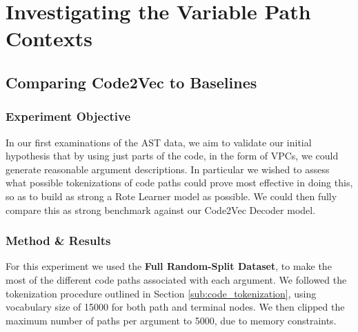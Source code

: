 \section{Investigating the Variable Path Contexts} %
\label{sec:investigating_the_computer_channel}

\subsection{Comparing Code2Vec to Baselines} %
\label{sub:comparing_code2vec_to_baselines}


\subsubsection{Experiment Objective} %

In our first examinations of the AST data, we aim to validate our initial hypothesis that by using just parts of the code, in the form of VPCs, we could generate reasonable argument descriptions.
In particular we wished to assess what possible tokenizations of code paths could prove most effective in doing this, so as to build as strong a Rote Learner model as possible. We could then fully compare this as strong benchmark against our Code2Vec Decoder model.

\subsubsection{Method \& Results} %

For this experiment we used the \textbf{Full Random-Split Dataset}, to make the most of the different code paths associated with each argument.
We followed the tokenization procedure outlined in Section \ref{sub:code_tokenization}, using vocabulary size of 15000 for both path and terminal nodes. We then clipped the maximum number of paths per argument to 5000, due to memory constraints. 

